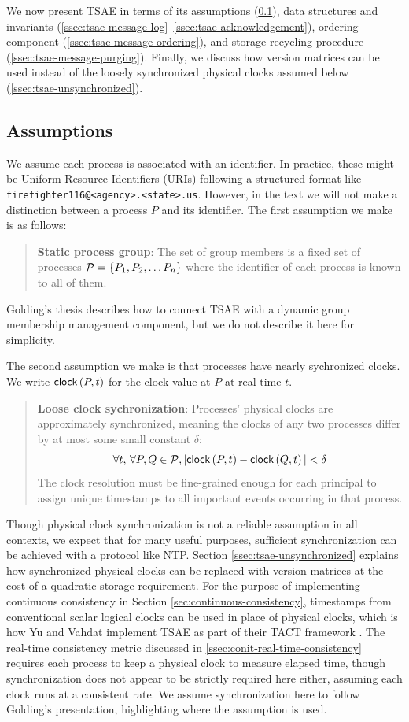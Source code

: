 \documentclass[]             %
{NASA}                       %
\theoremstyle{definition}
\begin{document}
We now present TSAE in terms of its assumptions
(\ref{ssec:tsae-assumptions}), data structures and invariants
(\ref{ssec:tsae-message-log}--\ref{ssec:tsae-acknowledgement}),
ordering component (\ref{ssec:tsae-message-ordering}), and storage
recycling procedure (\ref{ssec:tsae-message-purging}). Finally, we
discuss how version matrices can be used instead of the loosely
synchronized physical clocks assumed below
(\ref{ssec:tsae-unsynchronized}).

\subsection{Assumptions}
\label{ssec:tsae-assumptions}
We assume each process is associated with an identifier. In practice,
these might be Uniform Resource Identifiers (URIs) \cite{rfc3986}
following a structured format like
\texttt{firefighter116@<agency>.<state>.us}. However, in the text we
will not make a distinction between a process $P$ and its
identifier. The first assumption we make is as follows:
\begin{quote}
  \textbf{Static process group}: The set of group members is a fixed
  set of processes $\mathcal{P} = \{P_1, P_2, \ldots P_n\}$ where the
  identifier of each process is known to all of them.
\end{quote}
Golding's thesis describes how to connect TSAE with a dynamic group
membership management component, but we do not describe it here for
simplicity.

The second assumption we make is that processes have nearly
sychronized clocks. We write $\mathsf{clock}\left(P, t\right)$ for the clock value at $P$
at real time $t$.
\begin{quote}
  \textbf{Loose clock sychronization}: Processes' physical clocks are approximately
  synchronized, meaning the clocks of any two processes differ by at
  most some small constant $\delta$:
  \[ \forall t,\, \forall P, Q \in \mathcal{P}, |\mathsf{clock}\left(P, t\right) - \mathsf{clock}\left(Q, t\right)| < \delta
  \]
  The clock resolution must be fine-grained enough for each principal
  to assign unique timestamps to all important events occurring in
  that process.
\end{quote}

Though physical clock synchronization is not a reliable assumption in
all contexts, we expect that for many useful purposes, sufficient
synchronization can be achieved with a protocol like NTP.  Section
\ref{ssec:tsae-unsynchronized} explains how synchronized physical
clocks can be replaced with version matrices at the cost of a
quadratic storage requirement. For the purpose of implementing
continuous consistency in Section \ref{sec:continuous-consistency},
timestamps from conventional scalar logical clocks can be used in
place of physical clocks, which is how Yu and Vahdat implement TSAE as
part of their TACT framework \cite{2002tact}. The real-time
consistency metric discussed in \ref{ssec:conit-real-time-consistency}
requires each process to keep a physical clock to measure elapsed
time, though synchronization does not appear to be strictly required
here either, assuming each clock runs at a consistent rate. We assume
synchronization here to follow Golding's presentation, highlighting
where the assumption is used.
\end{document}
